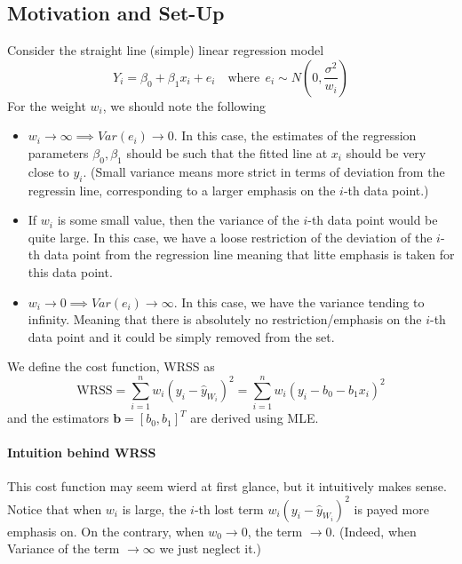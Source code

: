\documentclass[11pt]{article}
\newcommand{\bb}{\mathbf{b}}
\begin{document}
\subsection{Motivation and Set-Up}
Consider the straight line (simple) linear regression model
\begin{equation*}
    Y_{i}=\beta_{0}+\beta_{1} x_{i}+e_{i} \quad \text{where}~~ e_i \sim N \left(0, \frac{\sigma^2}{w_i}\right)
\end{equation*}
For the weight $w_i$, we should note the following
\begin{itemize}
    \item $w_i \rightarrow \infty \implies Var(e_i) \rightarrow 0$. In this case, the estimates of the regression parameters $\beta_0, \beta_1$ should be such that the fitted line at $x_i$ should be very close to $y_i$. (Small variance means more strict in terms of deviation from the regressin line, corresponding to a larger emphasis on the $i$-th data point.)
    \item If $w_i$ is some small value, then the variance of the $i$-th data point would be quite large. In this case, we have a loose restriction of the deviation of the $i$-th data point from the regression line meaning that litte emphasis is taken for this data point.
    \item $w_i \rightarrow 0 \implies Var(e_i) \rightarrow \infty$. In this case, we have the variance tending to infinity. Meaning that there is absolutely no restriction/emphasis on the $i$-th data point and it could be simply removed from the set.
\end{itemize}
We define the cost function, WRSS as
\begin{equation*}
    \mathrm{WRSS}=\sum_{i=1}^{n} w_{i}\left(y_{i}-\hat{y}_{W_i}\right)^{2}=\sum_{i=1}^{n} w_{i}\left(y_{i}-b_{0}-b_{1} x_{i}\right)^{2}
\end{equation*}
and the estimators $\bb = [b_0, b_1]^T$ are derived using MLE. 

\paragraph{Intuition behind WRSS} This cost function may seem wierd at first glance, but it intuitively makes sense. Notice that when $w_i$ is large, the $i$-th lost term $w_{i}\left(y_{i}-\hat{y}_{W_i}\right)^{2}$ is payed more emphasis on. On the contrary, when $w_0 \rightarrow 0$, the term $\rightarrow 0$. (Indeed, when Variance of the term $\rightarrow \infty$ we just neglect it.)
\end{document}
